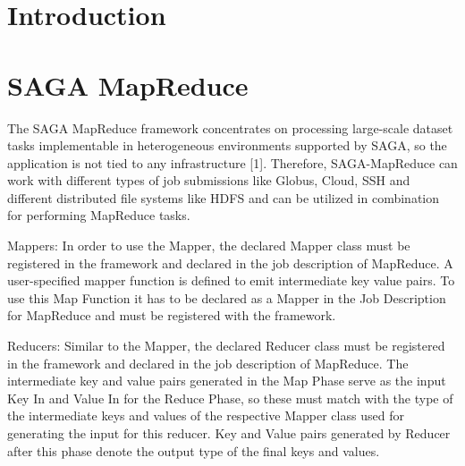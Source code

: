 \documentclass[12pt]{article}
\begin{document}
\maketitle


\section{Introduction}



\section{SAGA MapReduce}\label{previous work}

\indent The SAGA MapReduce framework concentrates on processing large-scale dataset tasks implementable in heterogeneous environments supported by SAGA, so the application is not tied to any infrastructure [1]. Therefore, SAGA-MapReduce can work with different types of job submissions like Globus, Cloud, SSH and different distributed file systems like HDFS and can be utilized in combination for performing MapReduce tasks.

Mappers: In order to use the Mapper, the declared Mapper class must be registered in the framework and declared in the job description of MapReduce. A user-specified mapper function is defined to emit intermediate key value pairs. To use this Map Function it has to be declared as a Mapper in the Job Description for MapReduce and must be registered with the framework. 

Reducers: Similar to the Mapper, the declared Reducer class must be registered in the framework and declared in the job description of MapReduce. The intermediate key and value pairs generated in the Map Phase serve as the input Key In and Value In for the Reduce Phase, so these must match with the type of the intermediate keys and values of the respective Mapper class used for generating the input for this reducer. Key and Value pairs generated by Reducer after this phase denote the output type of the final keys and values. 
\end{document}
